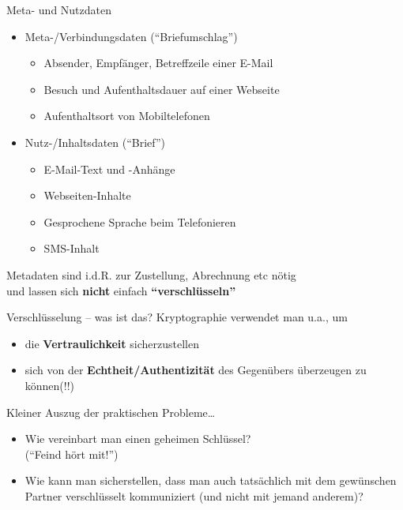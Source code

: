   \begin{frame}{Meta- und Nutzdaten}
    \begin{itemize}
      \item Meta-/Verbindungsdaten (``Briefumschlag'')
      \begin{itemize}
        \item Absender, Empfänger, Betreffzeile einer E-Mail
        \item Besuch und Aufenthaltsdauer auf einer Webseite
        \item Aufenthaltsort von Mobiltelefonen
      \end{itemize}
      \item Nutz-/Inhaltsdaten (``Brief'')
      \begin{itemize}
        \item E-Mail-Text und -Anhänge
        \item Webseiten-Inhalte
        \item Gesprochene Sprache beim Telefonieren
        \item SMS-Inhalt
      \end{itemize}
    \end{itemize}
  
    Metadaten sind i.d.R. zur Zustellung, Abrechnung etc nötig\\und lassen sich \textbf{nicht} einfach \textbf{``verschlüsseln''}
  \end{frame}

  \begin{frame}{Verschlüsselung -- was ist das?}
    Kryptographie verwendet man u.a., um
    \begin{itemize}
      \item die \textbf{Vertraulichkeit} sicherzustellen
      \item sich von der \textbf{Echtheit/Authentizität} des Gegenübers überzeugen zu können(!!)
    \end{itemize}

    Kleiner Auszug der praktischen Probleme\ldots
    \begin{itemize}
      \item Wie vereinbart man einen geheimen Schlüssel?\\(``Feind hört mit!'')
      \item Wie kann man sicherstellen, dass man auch tatsächlich mit dem gewünschen Partner verschlüsselt kommuniziert (und nicht mit jemand anderem)?
    \end{itemize}
  \end{frame}

